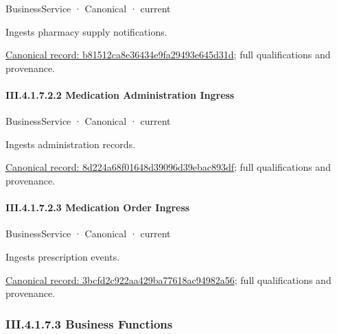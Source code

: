 \label{element:b81512ca8e36434e9fa29493e645d31d}
{\small BusinessService · Canonical · current}\par

Ingests pharmacy supply notifications.


{\footnotesize \href{../../../../../../../continuum/business/business-service/b81512ca8e36434e9fa29493e645d31d.md}{Canonical record: b81512ca8e36434e9fa29493e645d31d}; full qualifications and provenance.}\par
\paragraph*{III.4.1.7.2.2 Medication Administration Ingress}
\label{navigation:III.4.1.7.2.2}

\label{element:8d224a68f01648d39096d39ebac893df}
{\small BusinessService · Canonical · current}\par

Ingests administration records.


{\footnotesize \href{../../../../../../../continuum/business/business-service/8d224a68f01648d39096d39ebac893df.md}{Canonical record: 8d224a68f01648d39096d39ebac893df}; full qualifications and provenance.}\par
\paragraph*{III.4.1.7.2.3 Medication Order Ingress}
\label{navigation:III.4.1.7.2.3}

\label{element:3bcfd2c922aa429ba77618ac94982a56}
{\small BusinessService · Canonical · current}\par

Ingests prescription events.


{\footnotesize \href{../../../../../../../continuum/business/business-service/3bcfd2c922aa429ba77618ac94982a56.md}{Canonical record: 3bcfd2c922aa429ba77618ac94982a56}; full qualifications and provenance.}\par
\subsubsection*{III.4.1.7.3 Business Functions}
\label{navigation:III.4.1.7.3}

